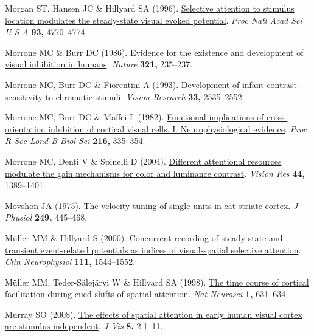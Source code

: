 \documentclass[
  letterpaper,
  DIV=11,
  numbers=noendperiod]{scrartcl}
\newlength{\cslhangindent}
\newenvironment{CSLReferences}[2] %
 {\begin{list}{}{%
  \setlength{\itemindent}{0pt}
  \setlength{\leftmargin}{0pt}
  \setlength{\parsep}{0pt}
  \ifodd #1
   \setlength{\leftmargin}{\cslhangindent}
   \setlength{\itemindent}{-1\cslhangindent}
  \fi
  \setlength{\itemsep}{#2\baselineskip}}}
 {\end{list}}
\begin{document}
\begin{CSLReferences}{1}{1}
Morgan ST, Hansen JC \& Hillyard SA (1996).
\href{https://doi.org/10.1073/pnas.93.10.4770}{Selective attention to
stimulus location modulates the steady-state visual evoked potential}.
\emph{Proc Natl Acad Sci U S A} \textbf{93,} 4770--4774.

Morrone MC \& Burr DC (1986).
\href{https://doi.org/10.1038/321235a0}{Evidence for the existence and
development of visual inhibition in humans}. \emph{Nature} \textbf{321,}
235--237.

Morrone MC, Burr DC \& Fiorentini A (1993).
\href{https://doi.org/10.1016/0042-6989(93)90133-H}{Development of
infant contrast sensitivity to chromatic stimuli}. \emph{Vision
Research} \textbf{33,} 2535--2552.

Morrone MC, Burr DC \& Maffei L (1982).
\href{https://doi.org/10.1098/rspb.1982.0078}{Functional implications of
cross-orientation inhibition of cortical visual cells. I.
Neurophysiological evidence}. \emph{Proc R Soc Lond B Biol Sci}
\textbf{216,} 335--354.

Morrone MC, Denti V \& Spinelli D (2004).
\href{https://doi.org/10.1016/j.visres.2003.10.014}{Different
attentional resources modulate the gain mechanisms for color and
luminance contrast}. \emph{Vision Res} \textbf{44,} 1389--1401.

Movshon JA (1975).
\href{https://doi.org/10.1113/jphysiol.1975.sp011025}{The velocity
tuning of single units in cat striate cortex}. \emph{J Physiol}
\textbf{249,} 445--468.

Müller MM \& Hillyard S (2000).
\href{https://doi.org/10.1016/s1388-2457(00)00371-0}{Concurrent
recording of steady-state and transient event-related potentials as
indices of visual-spatial selective attention}. \emph{Clin Neurophysiol}
\textbf{111,} 1544--1552.

Müller MM, Teder-Sälejärvi W \& Hillyard SA (1998).
\href{https://doi.org/10.1038/2865}{The time course of cortical
facilitation during cued shifts of spatial attention}. \emph{Nat
Neurosci} \textbf{1,} 631--634.

Murray SO (2008). \href{https://doi.org/10.1167/8.10.2}{The effects of
spatial attention in early human visual cortex are stimulus
independent}. \emph{J Vis} \textbf{8,} 2.1--11.


\end{CSLReferences}
\end{document}
